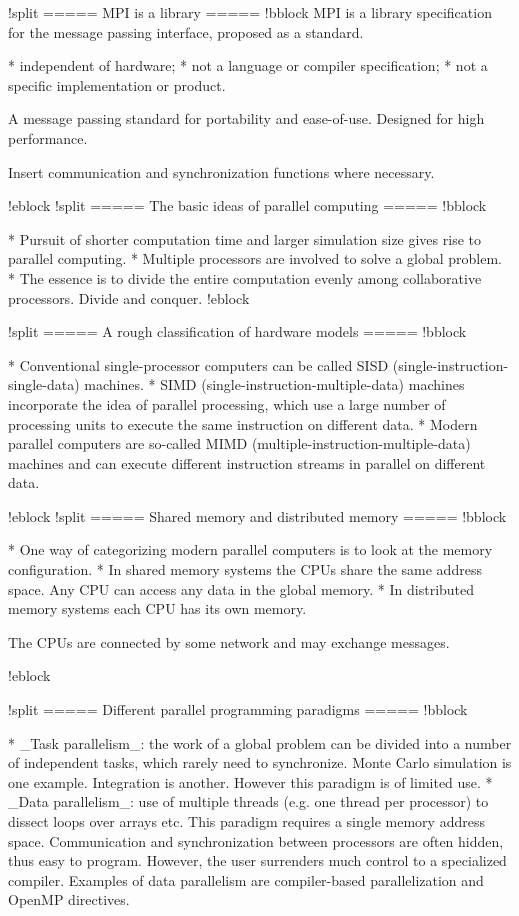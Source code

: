 !split
===== MPI is a library  =====
!bblock
MPI is a library specification for the message passing interface,
proposed as a standard.
\begin{itemize}
* independent of hardware;
* not a language or compiler specification;
* not a specific implementation or product.


A message passing standard for portability and ease-of-use. 
Designed for high performance.

Insert communication and synchronization functions where necessary.


!eblock
!split
===== The basic ideas of parallel computing =====
!bblock

* Pursuit of shorter computation time and larger simulation size gives rise to parallel computing.
* Multiple processors are involved to solve a global problem.
* The essence is to divide the entire computation evenly among collaborative processors.  Divide and conquer.
!eblock

!split
===== A rough classification of hardware models  =====
!bblock

* Conventional single-processor computers can be called SISD (single-instruction-single-data) machines.
* SIMD (single-instruction-multiple-data) machines incorporate the idea of parallel processing, which use a large number of processing units to execute the same instruction on different data.
* Modern parallel computers are so-called MIMD (multiple-instruction-multiple-data) machines and can execute different instruction streams in parallel on different data.


!eblock
!split
=====  Shared memory and distributed memory =====
!bblock

* One way of categorizing modern parallel computers is to look at the memory configuration.
* In shared memory systems the CPUs share the same address space. Any CPU can access any data in the global memory.
* In distributed memory systems each CPU has its own memory.

The CPUs are connected by some network and may exchange
messages.

!eblock

!split
=====    Different parallel programming paradigms  =====
!bblock

* _Task parallelism_:  the work of a global problem can be divided into a number of independent tasks, which rarely need to synchronize.  Monte Carlo simulation is one example. Integration is another. However this paradigm is of limited use.
* _Data parallelism_:  use of multiple threads (e.g. one thread per processor) to dissect loops over arrays etc.  This paradigm requires a single memory address space.  Communication and synchronization between processors are often hidden, thus easy to program. However, the user surrenders much control to a specialized compiler. Examples of data parallelism are compiler-based parallelization and OpenMP directives. 


\end{itemize}
